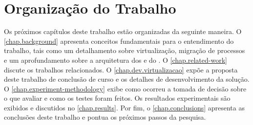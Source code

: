 \section{Organização do Trabalho}
\label{sec.organization}

Os próximos capítulos deste trabalho estão organizadas da seguinte maneira. O \autoref{chap.background} apresenta conceitos fundamentais para o entendimento do trabalho, tais como um detalhamento sobre virtualização, migração de processos e um aprofundamento sobre a arquitetura dos \lws e do \nanvix. O \autoref{chap.related-work} discute os trabalhos relacionados. O \autoref{chap.dev.virtualizacao} expõe a proposta deste trabalho de conclusão de curso e os detalhes de desenvolvimento da solução. O \autoref{chap.experiment-methodology} exibe como ocorreu a tomada de decisão sobre o que avaliar e como os testes foram feitos. Os resultados experimentais são exibidos e discutidos no \autoref{chap.results}. Por fim, o \autoref{chap.conclusions} apresenta as conclusões deste trabalho e pontua os próximos passos da pesquisa.
